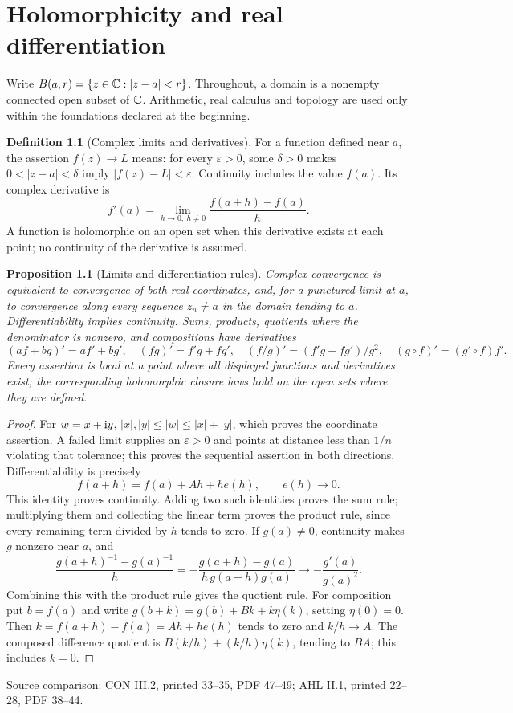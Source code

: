 \documentclass[11pt,a4paper,openany]{book}
\newtheorem{proposition}[theorem]{Proposition}
\theoremstyle{definition}
\newtheorem{definition}[theorem]{Definition}
\theoremstyle{remark}\newtheorem{remark}[theorem]{Remark}
\newcommand{\eps}{\varepsilon}\newcommand{\ee}{\varepsilon}
\newcommand{\family}[1]{}
\newcommand{\source}[1]{\par\begingroup\small\sffamily\color{black!65}Source comparison: #1\par\endgroup}
\begin{document}


\chapter{Holomorphicity and real differentiation}\label{ch:d12-01}

Write \(B(a,r)=\{z\in\mathbb C:|z-a|<r\}\). Throughout, a domain is a
nonempty connected open subset of \(\mathbb C\). Arithmetic, real calculus and
topology are used only within the foundations declared at the beginning.

\begin{definition}[Complex limits and derivatives]\family{D12.01.01}\label{d12:01-01}
For a function defined near \(a\), the assertion \(f(z)\to L\) means:
for every \(\eps>0\), some \(\delta>0\) makes
\(0<|z-a|<\delta\) imply \(|f(z)-L|<\eps\).
Continuity includes the value \(f(a)\). Its complex derivative is
\[
 f'(a)=\lim_{h\to0,\ h\ne0}\frac{f(a+h)-f(a)}h .
\]
A function is holomorphic on an open set when this derivative exists at
each point; no continuity of the derivative is assumed.
\end{definition}
\begin{proposition}[Limits and differentiation rules]\label{d12:01-01-rules}
Complex convergence is equivalent to convergence of both real coordinates,
and, for a punctured limit at \(a\), to convergence along every sequence
\(z_n\ne a\) in the domain tending to \(a\). Differentiability implies
continuity. Sums, products,
quotients where the denominator is nonzero, and compositions have derivatives
\[
 (af+bg)'=af'+bg',\quad (fg)'=f'g+fg',\quad
 (f/g)'=(f'g-fg')/g^2,\quad (g\circ f)'=(g'\circ f)f'.
\]
Every assertion is local at a point where all displayed functions and
derivatives exist; the corresponding holomorphic closure laws hold on the
open sets where they are defined.
\end{proposition}
\begin{proof}
For \(w=x+\mathrm i y\), \(|x|,|y|\leq |w|\leq |x|+|y|\), which proves the
coordinate assertion. A failed limit supplies an \(\eps>0\) and points at
distance less than \(1/n\) violating that tolerance; this proves the
sequential assertion in both directions. Differentiability is precisely
\[
 f(a+h)=f(a)+Ah+h e(h),\qquad e(h)\longrightarrow0.
\]
This identity proves continuity. Adding two such identities proves the sum
rule; multiplying them and collecting the linear term proves the product
rule, since every remaining term divided by \(h\) tends to zero.
If \(g(a)\ne0\), continuity makes \(g\) nonzero near \(a\), and
\[
 \frac{g(a+h)^{-1}-g(a)^{-1}}h
 =-\frac{g(a+h)-g(a)}{h\,g(a+h)g(a)}
 \longrightarrow-\frac{g'(a)}{g(a)^2}.
\]
Combining this with the product rule gives the quotient rule.
For composition put \(b=f(a)\) and write
\(g(b+k)=g(b)+Bk+k\eta(k)\), setting \(\eta(0)=0\).
Then \(k=f(a+h)-f(a)=Ah+he(h)\) tends to zero and \(k/h\to A\).
The composed difference quotient is
\(B(k/h)+(k/h)\eta(k)\), tending to \(BA\); this includes \(k=0\).
\end{proof}
\source{CON III.2, printed 33--35, PDF 47--49; AHL II.1, printed 22--28, PDF 38--44.}
\end{document}
